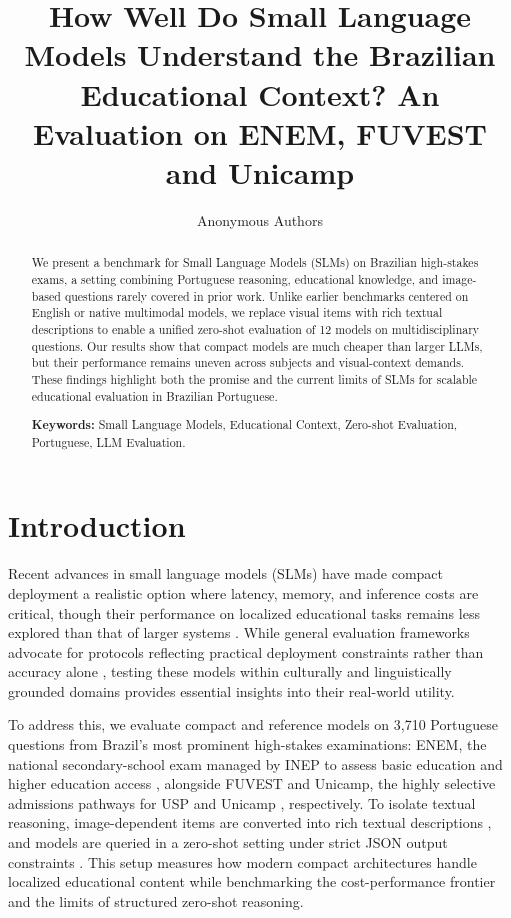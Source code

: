 \documentclass[12pt]{article}
\title{How Well Do Small Language Models Understand the Brazilian Educational Context? An Evaluation on ENEM, FUVEST and Unicamp}
\author{Anonymous Authors}
\begin{document}
\maketitle

\begin{abstract}
We present a benchmark for Small Language Models (SLMs) on Brazilian high-stakes exams, a setting combining Portuguese reasoning, educational knowledge, and image-based questions rarely covered in prior work. Unlike earlier benchmarks centered on English or native multimodal models, we replace visual items with rich textual descriptions to enable a unified zero-shot evaluation of 12 models on multidisciplinary questions. Our results show that compact models are much cheaper than larger LLMs, but their performance remains uneven across subjects and visual-context demands. These findings highlight both the promise and the current limits of SLMs for scalable educational evaluation in Brazilian Portuguese.

\vspace{6pt}
\noindent \textbf{Keywords:} Small Language Models, Educational Context, Zero-shot Evaluation, Portuguese, LLM Evaluation.
\end{abstract}

\section{Introduction}
\label{sec:intro}
Recent advances in small language models (SLMs) have made compact deployment a realistic option where latency, memory, and inference costs are critical, though their performance on localized educational tasks remains less explored than that of larger systems \cite{nguyen2025survey,pham2025slmbench}. While general evaluation frameworks advocate for protocols reflecting practical deployment constraints rather than accuracy alone \cite{liang2023helm}, testing these models within culturally and linguistically grounded domains provides essential insights into their real-world utility.

To address this, we evaluate compact and reference models on 3,710 Portuguese questions from Brazil's most prominent high-stakes examinations: ENEM, the national secondary-school exam managed by INEP to assess basic education and higher education access \cite{inep_enem}, alongside FUVEST and Unicamp, the highly selective admissions pathways for USP \cite{usp_fuvest} and Unicamp \cite{comvest_unicamp}, respectively. To isolate textual reasoning, image-dependent items are converted into rich textual descriptions \cite{das2024examsv}, and models are queried in a zero-shot setting under strict JSON output constraints \cite{lu2025learning}. This setup measures how modern compact architectures handle localized educational content while benchmarking the cost-performance frontier and the limits of structured zero-shot reasoning.
\end{document}
